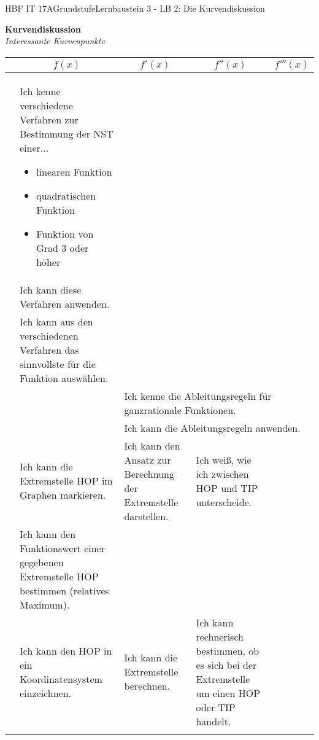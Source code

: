 \documentclass[oneside,openany,headings=optiontotoc,12pt,numbers=noenddot]{article}
\begin{document}
	\begin{worksheet}{HBF IT 17A}{Grundstufe}{Lernbaustein 3 - LB 2: Die Kurvendiskussion}
		\begin{framed}
			\begin{center}
				\textbf{Kurvendiskussion}\\
				\textit{Interessante Kurvenpunkte}
			\end{center}
			\tiny
			\raggedright
			\begin{tabularx}{\textwidth}{l|X|X|X|X|}
				\cline{2-5}
				& \multicolumn{1}{|c|}{\normalsize\(f(x)\)} & \multicolumn{1}{c|}{\normalsize\(f'(x)\)} & \multicolumn{1}{c|}{\normalsize\(f''(x)\)} & \multicolumn{1}{c|}{\normalsize\(f'''(x)\)}\\
				\hline\hline
				& Ich kenne verschiedene Verfahren zur Bestimmung der NST einer...
				\begin{itemize}
					\item linearen Funktion
					\item quadratischen Funktion
					\item Funktion von Grad 3 oder höher
				\end{itemize} & & &\\
				\cline{2-2}
				\multirow{2}{*}{\tabrotate{Nullstellen}}
				& Ich kann diese Verfahren anwenden. & & &\\
				\cline{2-2}
				& Ich kann aus den verschiedenen Verfahren das sinnvollste für die Funktion auswählen. & & &\\
				\hline\hline
				& & \multicolumn{3}{l|}{Ich kenne die Ableitungsregeln für ganzrationale Funktionen.}\\
				\cline{3-5}
				& & \multicolumn{3}{l|}{Ich kann die Ableitungsregeln anwenden.}\\
				\hline\hline
				& Ich kann die Extremstelle HOP im Graphen markieren.& Ich kann den Ansatz zur Berechnung der Extremstelle darstellen.& Ich weiß, wie ich zwischen HOP und TIP unterscheide.& \\
				\cline{2-2}
				\multirow{2}{*}{\tabrotate{Extremstelle HOP}}
				& Ich kann den Funktionswert einer gegebenen Extremstelle HOP bestimmen (\colorbox{blue!5}{relatives Maximum}).& & &\\
				\cline{2-4}
				& Ich kann den HOP in ein Koordinatensystem einzeichnen. &  Ich kann die Extremstelle berechnen. & Ich kann rechnerisch bestimmen, ob es sich bei der Extremstelle um einen HOP oder TIP handelt. &\\
				\hhline{=|=|~|~|=}

\end{tabularx}
\end{framed}
\end{worksheet}
\end{document}
